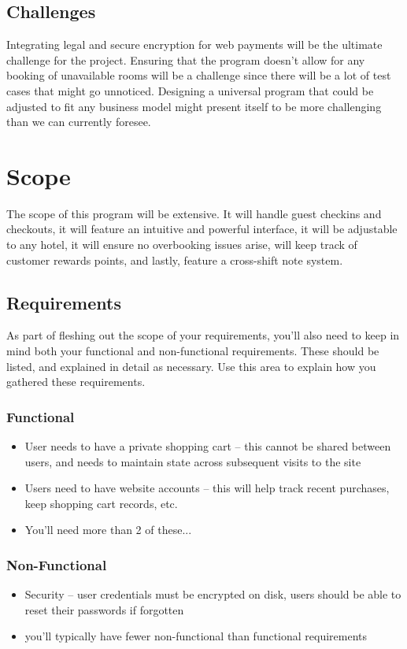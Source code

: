 \documentclass[10pt,conference,onecolumn,compsoc]{IEEEtran}
\begin{document}
\subsection{Challenges}
Integrating legal and secure encryption for web payments will be the ultimate challenge for the project. 
Ensuring that the program doesn't allow for any booking of unavailable rooms will be a challenge since there will be a lot of test cases that might go unnoticed.
Designing a universal program that could be adjusted to fit any business model might present itself to be more challenging than we can currently foresee. 


\section{Scope}
The scope of this program will be extensive. It will handle guest checkins and checkouts, it will feature an intuitive and powerful interface, it will be adjustable to any hotel, it will ensure no overbooking issues arise, will keep track of customer rewards points, and lastly, feature a cross-shift note system. 

\subsection{Requirements}
As part of fleshing out the scope of your requirements, you'll also need to keep in mind both your functional and non-functional requirements.  These should be listed, and explained in detail as necessary.  Use this area to explain how you gathered these requirements.

\subsubsection{Functional}
\begin{itemize}
\item User needs to have a private shopping cart -- this cannot be shared between users, and needs to maintain state across subsequent visits to the site
\item Users need to have website accounts -- this will help track recent purchases, keep shopping cart records, etc.
\item You'll need more than 2 of these...
\end{itemize}

\subsubsection{Non-Functional}
\begin{itemize}
\item Security -- user credentials must be encrypted on disk, users should be able to reset their passwords if forgotten
\item you'll typically have fewer non-functional than functional requirements
\end{itemize}
\end{document}
